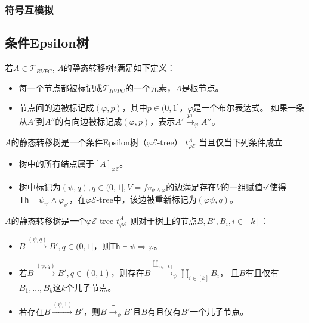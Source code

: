    \subsubsection{符号互模拟}
\subsection{条件Epsilon树}
\begin{definition}
   \label{def:silent_tree}
   若$A\in \mathcal{T}_{RVPC}$,
   $A$的静态转移树$t$满足如下定义：
   \begin{itemize}
   \item 每一个节点都被标记成$\mathcal{T}_{RVPC}$的一个元素，$A$是根节点。
   \item {
      节点间的边被标记成$(\varphi,p)$，其中$p\in(0,1]$，$\varphi$是一个布尔表达式。
      如果一条从$A'$到$A''$的有向边被标记成$(\varphi,p)$，表示$A'\stackrel{p\tau}{\rightarrow}_{\varphi} A''$。
   }
   \end{itemize}
\end{definition}

\begin{definition}
   $A$的静态转移树是一个条件Epsilon树（$\varphi \mathcal{E}$-tree） $t^A_{\varphi \mathcal{E}}$ 
当且仅当下列条件成立
\begin{itemize}
   \item 树中的所有结点属于$[A]_{\varphi \mathcal{E}}$。
   \item 树中标记为$(\psi, q),q\in(0,1],V=fv_{\psi\wedge\varphi}$的边满足存在$V$的一组赋值$v'$使得$\mathsf{Th}\vdash \psi_{v'}\wedge\varphi_{v'}$，在$\varphi\mathcal{E}$-tree中，该边被重新标记为$(\varphi\psi,q)$。
\end{itemize}
\end{definition}

\begin{corollary}
   $A$的静态转移树是一个$\varphi \mathcal{E}$-tree $t^A_{\varphi \mathcal{E}}$ 则对于树上的节点$B,B',B_i,i\in [k]$：
   \begin{itemize}
      \item {
         $B\stackrel{(\psi,q)}{\rightarrow}B',q\in(0,1]$，则$\mathsf{Th}\vdash\psi\Rightarrow\varphi$。
      }
      \item {
         若$B\stackrel{(\psi,q)}{\rightarrow}B',q\in (0,1)$，则存在$B\stackrel{\coprod_{i\in [k]}}{\longrightarrow}_{\psi} \coprod_{i\in [k]} B_i$，
         且$B$有且仅有$B_1,\dots, B_k$这$k$个儿子节点。
      }
      \item {
         若存在$B\stackrel{(\psi,1)}{\rightarrow}B'$，则$B\stackrel{\tau}{\rightarrow}_{\psi}B'$且$B$有且仅有$B'$一个儿子节点。
      }
   \end{itemize}
\end{corollary}

